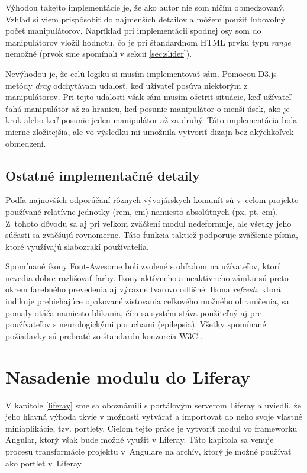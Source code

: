 \documentclass[
  printed, %
  twoside, %
  notable,   %
  nolof,   %
  nolot,   %
]{fithesis3}
\begin{document}
Výhodou takejto implementácie je, že ako autor nie som ničím obmedzovaný. Vzhľad si viem prispôsobiť do najmenších detailov a môžem použiť ľubovoľný počet manipulátorov. Napríklad pri implementácii spodnej osy som do manipulátorov vložil hodnotu, čo je pri štandardnom HTML prvku typu \textit{range} nemožné (prvok sme spomínali v sekcii \ref{sec:slider}).

Nevýhodou je, že celú logiku si musím implementovať sám. Pomocou D3.js metódy \textit{drag} odchytávam udalosť, keď užívateľ posúva niektorým z manipulátorov. Pri tejto udalosti však sám musím ošetriť situácie, keď užívateľ ťahá manipulátor až za hranicu, keď posunie manipulátor o menší úsek, ako je krok alebo keď posunie jeden manipulátor až za druhý. Táto implementácia bola mierne zložitejšia, ale vo výsledku mi umožnila vytvoriť dizajn bez akýchkoľvek obmedzení.

\section{Ostatné implementačné detaily}
Podľa najnovších odporúčaní rôznych vývojárskych komunít \cite{Etienne2017} sú v~celom projekte používané relatívne jednotky (rem, em) namiesto absolútnych (px, pt, cm). Z~tohoto dôvodu sa aj pri veľkom zväčšení modul nedeformuje, ale všetky jeho súčasti sa zväčšujú rovnomerne. Táto funkcia taktiež podporuje zväčšenie písma, ktoré využívajú slabozrakí používatelia.

Spomínané ikony Font-Awesome boli zvolené s ohľadom na užívateľov, ktorí nevedia dobre rozlišovať farby. Ikony aktívneho a neaktívneho zámku sú preto okrem farebného prevedenia aj výrazne tvarovo odlišné. Ikona \textit{refresh}, ktorá indikuje prebiehajúce opakované zisťovania celkového možného ohraničenia, sa pomaly otáča namiesto blikania, čím sa systém stáva použiteľný aj pre používateľov s neurologickými poruchami (epilepsia). Všetky spomínané požiadavky sú prebraté zo štandardu konzorcia W3C \cite{caldwell2008web}.

\chapter{Nasadenie modulu do Liferay}
V kapitole \ref{liferay} sme sa oboznámili s portálovým serverom Liferay a uviedli, že jeho hlavná výhoda tkvie v možnosti vytvárať a importovať do neho svoje vlastné miniaplikácie, tzv. portlety. Cieľom tejto práce je vytvoriť modul vo frameworku Angular, ktorý však bude možné využiť v Liferay. Táto kapitola sa venuje procesu transformácie projektu v~Angulare na archív, ktorý je možné používať ako portlet v~Liferay.
\end{document}
